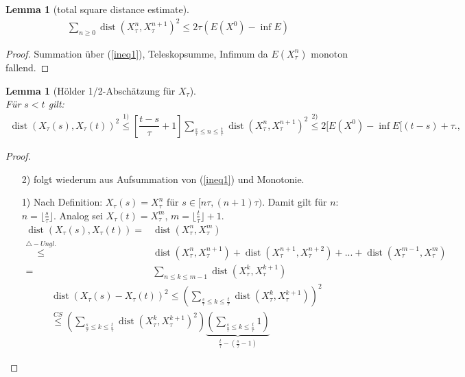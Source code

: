 \documentclass[11pt,a4paper,notitlepage]{scrreprt}
\newcommand{\dist}{\operatorname{dist}}
\newtheorem{lem}[defi]{Lemma}
\begin{document}
\begin{lem}[total square distance estimate]
\begin{eqnarray}
\sum_{n\geq 0}\dist(X_\tau^n,X_\tau^{n+1})^2\leq 2\tau (E(X^0)-\inf E)\label{totalsquare}
\end{eqnarray}
\end{lem}
\begin{proof}
Summation über (\ref{ineq1}), Teleskopsumme, Infimum da $E(X_\tau^n)$ monoton fallend.
\end{proof}

\begin{lem}[Hölder 1/2-Abschätzung für $X_\tau$]  $~~$ \\
Für $s<t$ gilt:
\begin{eqnarray}
\dist(X_\tau(s),X_\tau(t))^2 \overset{1)}\leq \left[\dfrac{t-s}{\tau}+1\right] \sum_{\frac{s}{\tau}\leq n \leq \frac{t}{\tau}} \dist (X^n_\tau, X_\tau^{n+1})^2 \overset{2)}\leq 2[E(X^0)-\inf E[(t-s)+\tau., \label{Hölder}
\end{eqnarray}
\end{lem}

\begin{proof}
\begin{itemize}
\item[2)] folgt wiederum aus Aufsummation von (\ref{ineq1}) und Monotonie.
\item[1)] Nach Definition: $X_\tau(s)=X_\tau^n$ für $s\in [n\tau,(n+1)\tau)$. Damit gilt für $n$: $n=\lfloor \frac{s}{	\tau}\rfloor$. Analog sei $X_\tau(t)=X_\tau^m$, $m=\lfloor\frac{t}{\tau}\rfloor+1$.\\
\begin{align*}
\dist(X_\tau(s),X_\tau(t))=&\dist(X_\tau^n,X_\tau^m)\\\overset{\triangle -Ungl.}\leq&\dist(X_\tau^n,X_\tau^{n+1})+\dist(X_\tau^{n+1},X_\tau^{n+2})+...+\dist(X_\tau^{m-1},X_\tau^m)\\
=&\sum_{n\leq k\leq m-1}\dist(X_\tau^k,X_\tau^{k+1})
\end{align*}
\begin{align*}
\dist(X_\tau(s)-X_\tau(t))^2\leq\left(\sum_{\frac{s}{\tau}\leq k\leq \frac{t}{\tau}}\dist(X_\tau^k,X_\tau^{k+1})\right)^2 \\ \overset{CS}\leq\left(\sum_{\frac{s}{\tau}\leq k\leq \frac{t}{\tau}}\dist(X_\tau^k,X_\tau^{k+1})^2\right)\underset{\frac{t}{\tau}-(\frac{s}{\tau}-1)}{\underbrace{\left(\sum_{\frac{s}{\tau}\leq k\leq \frac{t}{\tau}}1\right)}}
\end{align*}
\end{itemize}
\end{proof}
\end{document}
